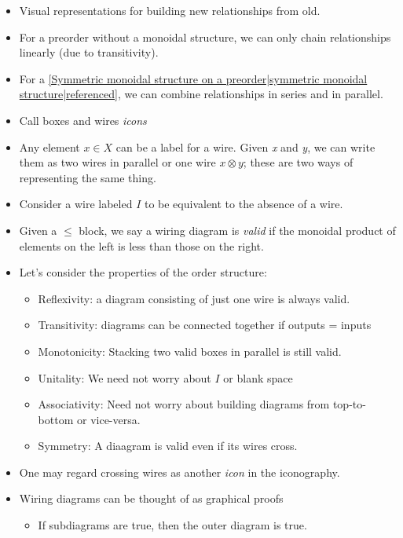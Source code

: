 \begin{itemize}
    \item Visual representations for building new relationships from old.
    \item For a preorder without a monoidal structure, we can only chain relationships linearly (due to transitivity).
    \item For a \ref{Symmetric monoidal structure on a preorder|symmetric monoidal structure|referenced}, we can combine relationships in series and in parallel.
    \item Call boxes and wires \emph{icons}
    \item Any element $x \in X$ can be a label for a wire. Given \emph{x} and \emph{y}, we can write them as two wires in parallel or one wire $x \otimes y$; these are two ways of representing the same thing.
    \item Consider a wire labeled $I$ to be equivalent to the absence of a wire.
    \item Given a $\leq$ block, we say a wiring diagram is \emph{valid} if the monoidal product of elements on the left is less than those on the right.
    \item Let's consider the properties of the order structure:
          \begin{itemize}
            \item Reflexivity: a diagram consisting of just one wire is always valid.
            \item Transitivity: diagrams can be connected together if outputs = inputs
            \item Monotonicity: Stacking two valid boxes in parallel is still valid.
            \item Unitality: We need not worry about $I$ or blank space
            \item Associativity: Need not worry about building diagrams from top-to-bottom or vice-versa.
            \item Symmetry: A diaagram is valid even if its wires cross.
          \end{itemize}
    \item One may regard crossing wires as another \emph{icon} in the iconography.
    \item Wiring diagrams can be thought of as graphical proofs
          \begin{itemize}
            \item If subdiagrams are true, then the outer diagram is true.
          \end{itemize}
  \end{itemize}
